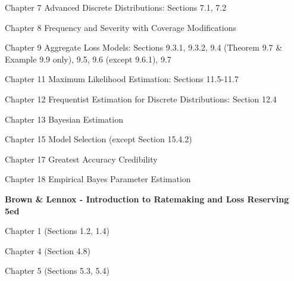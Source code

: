 \documentclass[hidelinks, 12pt]{article}
\theoremstyle{mydefstyle}
\theoremstyle{mythmstyle}
\begin{document}
\newpage

Chapter 7 Advanced Discrete Distributions: Sections 7.1, 7.2

Chapter 8 Frequency and Severity with Coverage Modifications

Chapter 9 Aggregate Loss Models: Sections 9.3.1, 9.3.2, 9.4 (Theorem 9.7 \& Example 9.9 only), 9.5, 9.6 (except 9.6.1), 9.7

Chapter 11 Maximum Likelihood Estimation: Sections 11.5-11.7

Chapter 12 Frequentist Estimation for Discrete Distributions: Section 12.4

Chapter 13 Bayesian Estimation

Chapter 15 Model Selection (except Section 15.4.2)

Chapter 17 Greatest Accuracy Credibility

Chapter 18 Empirical Bayes Parameter Estimation

\textbf{Brown \& Lennox - Introduction to Ratemaking and Loss Reserving 5ed}

Chapter 1 (Sections 1.2, 1.4)

Chapter 4 (Section 4.8)

Chapter 5 (Sections 5.3, 5.4)
\end{document}
